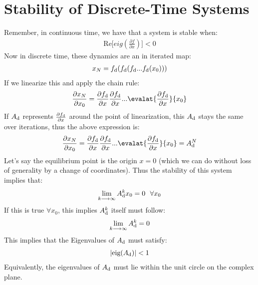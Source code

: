 \section{Stability of Discrete-Time Systems}
Remember, in continuous time, we have that a system is stable when:
\begin{align}
    \textrm{Re} \big[ eig ( \frac{\partial f}{\partial x} ) \big] < 0
\end{align}
Now in discrete time, these dynamics are an in iterated map:
\begin{align}
    x_{N} = f_{\rm d} ( f_{\rm d} ( f_{\rm d} ... f_{\rm d} (x_0)))
\end{align}
If we linearize this and apply the chain rule:
\begin{align}
    \frac{\partial x_N}{\partial x_0} = \frac{\partial f_{\rm d}}{\partial x} \frac{\partial f_{\rm d}}{\partial x} ... \evalat{\frac{\partial f_{\rm d}}{\partial x}}{x_0}
\end{align}
If $A_{\rm d}$ represents $\frac{\partial f_{\rm d}}{\partial x}$ around the point of linearization, this $A_{\rm d}$ stays the same over iterations, thus the above expression is:
\begin{align}
    \frac{\partial x_N}{\partial x_0} = \frac{\partial f_{\rm d}}{\partial x} \frac{\partial f_{\rm d}}{\partial x} ... \evalat{\frac{\partial f_{\rm d}}{\partial x}}{x_0} = A_{\rm d}^N
\end{align}
Let's say the equilibrium point is the origin $x=0$ (which we can do without loss of generality by a change of coordinates). Thus the stability of this system implies that:
\begin{align}
    \lim_{k \longrightarrow \infty} A_{\rm d}^k x_0 = 0 \ \ \forall x_0
\end{align}
If this is true $\forall x_0$, this implies $A_{\rm d}^k$ itself must follow:
\begin{align}
    \lim_{k \longrightarrow \infty} A_{\rm d}^k = 0
\end{align}
This implies that the Eigenvalues of $A_{\rm d}$ must satisfy:
\begin{align}
    | \textrm{eig} ( A_{\rm d})  | < 1
\end{align}
Equivalently, the eigenvalues of $A_{\rm d}$ must lie within the unit circle on the complex plane.


